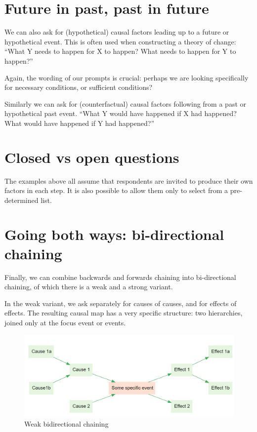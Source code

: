 \documentclass[
]{book}
\begin{document}
\hypertarget{future-in-past-past-in-future}{%
\section{Future in past, past in future}\label{future-in-past-past-in-future}}

We can also ask for (hypothetical) causal factors leading up to a future or hypothetical event. This is often used when constructing a theory of change: ``What Y needs to happen for X to happen? What needs to happen for Y to happen?''

Again, the wording of our prompts is crucial: perhaps we are looking specifically for necessary conditions, or sufficient conditions?

Similarly we can ask for (counterfactual) causal factors following from a past or hypothetical past event. ``What Y would have happened if X had happened? What would have happened if Y had happened?''

\hypertarget{closed-vs-open-questions}{%
\section{Closed vs open questions}\label{closed-vs-open-questions}}

The examples above all assume that respondents are invited to produce their own factors in each step. It is also possible to allow them only to select from a pre-determined list. \citep{hodgkinson2004}

\hypertarget{going-both-ways-bi-directional-chaining}{%
\section{Going both ways: bi-directional chaining}\label{going-both-ways-bi-directional-chaining}}

Finally, we can combine backwards and forwards chaining into bi-directional chaining, of which there is a weak and a strong variant.

In the weak variant, we ask separately for causes of causes, and for effects of effects. The resulting causal map has a very specific structure: two hierarchies, joined only at the focus event or events.

\begin{figure}
\centering
\includegraphics{_assets/image-20210215094522576.png}
\caption{Weak bidirectional chaining}
\end{figure}
\end{document}
